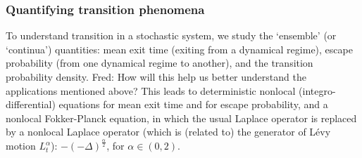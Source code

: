 \documentclass[11pt]{NSFamsart}
\newcommand{\FredNote}[1]{{\color{blue} Fred: #1}}
\begin{document}



 
\subsubsection*{Quantifying transition phenomena}
To understand transition   in    a stochastic system, we  study the     `ensemble' (or `continua') quantities: mean exit time (exiting from a dynamical regime),   escape probability (from one dynamical regime to another), and  the transition  probability density. \FredNote{How will this help us better understand the applications mentioned above?}
This leads to deterministic  nonlocal (integro-differential) equations for mean exit time and for escape probability, and a nonlocal Fokker-Planck equation,
in which the usual Laplace operator is replaced
by a nonlocal Laplace operator (which is (related to) the generator of L\'evy motion $L_t^\alpha$):  $-(-\Delta)^{\frac{\alpha}2  }$, for $\alpha \in (0, 2)$.
 
\end{document}
